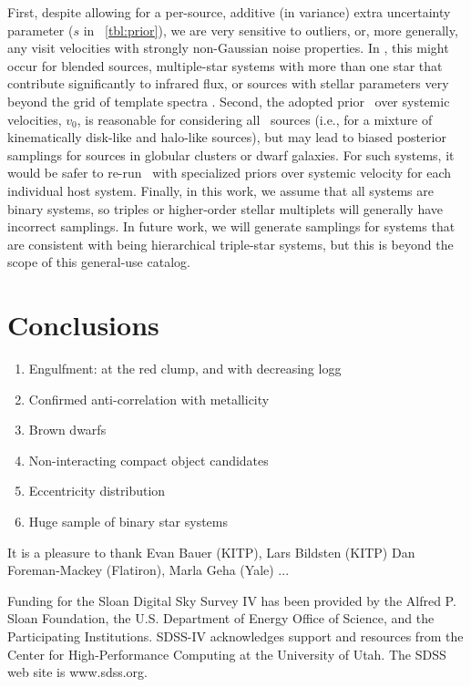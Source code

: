\documentclass[modern]{aastex63}
\begin{document}
First, despite allowing for a per-source, additive (in variance) extra
uncertainty parameter ($s$ in \tablename~\ref{tbl:prior}), we are very sensitive
to outliers, or, more generally, any visit velocities with strongly non-Gaussian
noise properties.
In \apogee, this might occur for blended sources, multiple-star systems with
more than one star that contribute significantly to infrared flux, or sources
with stellar parameters very beyond the grid of template spectra
\citep{Nidever:2015}.
Second, the adopted prior \pdf\ over systemic velocities, $v_0$, is reasonable
for considering all \apogee\ sources (i.e., for a mixture of kinematically
disk-like and halo-like sources), but may lead to biased posterior samplings for
sources in globular clusters or dwarf galaxies.
For such systems, it would be safer to re-run \thejoker\ with specialized priors
over systemic velocity for each individual host system.
Finally, in this work, we assume that all systems are binary systems, so triples
or higher-order stellar multiplets will generally have incorrect samplings.
In future work, we will generate samplings for systems that are consistent with
being hierarchical triple-star systems, but this is beyond the scope of this
general-use catalog.


\section{Conclusions}

\begin{enumerate}
    \item Engulfment: at the red clump, and with decreasing logg
    \item Confirmed anti-correlation with metallicity
    \item Brown dwarfs
    \item Non-interacting compact object candidates
    \item Eccentricity distribution
    \item Huge sample of binary star systems
\end{enumerate}


\acknowledgements

It is a pleasure to thank
Evan Bauer (KITP),
Lars Bildsten (KITP)
Dan Foreman-Mackey (Flatiron),
Marla Geha (Yale)
...

Funding for the Sloan Digital Sky Survey IV has been provided by the Alfred P.
Sloan Foundation, the U.S. Department of Energy Office of Science, and the
Participating Institutions. SDSS-IV acknowledges support and resources from the
Center for High-Performance Computing at the University of Utah. The SDSS web
site is www.sdss.org.
\end{document}
